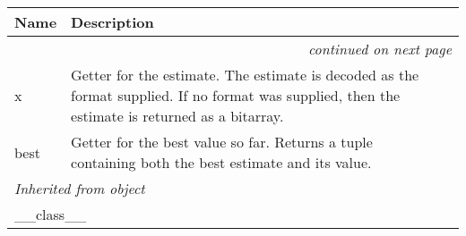     \vspace{-1cm}
\hspace{\varindent}\begin{longtable}{|p{\varnamewidth}|p{\vardescrwidth}|l}
\cline{1-2}
\cline{1-2} \centering \textbf{Name} & \centering \textbf{Description}& \\
\cline{1-2}
\endhead\cline{1-2}\multicolumn{3}{r}{\small\textit{continued on next page}}\\\endfoot\cline{1-2}
\endlastfoot\raggedright x\- & \raggedright Getter for the estimate. The estimate is decoded as the format supplied.
If no format was supplied, then the estimate is returned as a bitarray.&\\
\cline{1-2}
\raggedright b\-e\-s\-t\- & \raggedright Getter for the best value so far. Returns a tuple containing both the
best estimate and its value.&\\
\cline{1-2}
\multicolumn{2}{|l|}{\textit{Inherited from object}}\\
\multicolumn{2}{|p{\varwidth}|}{\raggedright \_\_class\_\_}\\
\cline{1-2}
\end{longtable}

